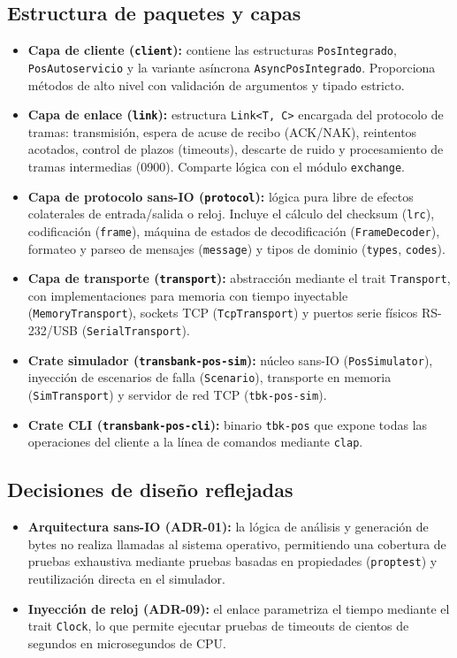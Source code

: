 \documentclass{../../plantilla/raysac-informe}
\begin{document}
\subsection{Estructura de paquetes y capas}
\begin{itemize}
  \item \textbf{Capa de cliente (\texttt{client}):} contiene las estructuras \texttt{PosIntegrado},
    \texttt{PosAutoservicio} y la variante asíncrona \texttt{AsyncPosIntegrado}. Proporciona métodos
    de alto nivel con validación de argumentos y tipado estricto.
  \item \textbf{Capa de enlace (\texttt{link}):} estructura \texttt{Link<T, C>} encargada del protocolo
    de tramas: transmisión, espera de acuse de recibo (ACK/NAK), reintentos acotados, control de plazos
    (timeouts), descarte de ruido y procesamiento de tramas intermedias (0900). Comparte lógica con
    el módulo \texttt{exchange}.
  \item \textbf{Capa de protocolo sans-IO (\texttt{protocol}):} lógica pura libre de efectos colaterales de
    entrada/salida o reloj. Incluye el cálculo del checksum (\texttt{lrc}), codificación (\texttt{frame}),
    máquina de estados de decodificación (\texttt{FrameDecoder}), formateo y parseo de mensajes
    (\texttt{message}) y tipos de dominio (\texttt{types}, \texttt{codes}).
  \item \textbf{Capa de transporte (\texttt{transport}):} abstracción mediante el trait \texttt{Transport},
    con implementaciones para memoria con tiempo inyectable (\texttt{MemoryTransport}), sockets TCP
    (\texttt{TcpTransport}) y puertos serie físicos RS-232/USB (\texttt{SerialTransport}).
  \item \textbf{Crate simulador (\texttt{transbank-pos-sim}):} núcleo sans-IO (\texttt{PosSimulator}),
    inyección de escenarios de falla (\texttt{Scenario}), transporte en memoria (\texttt{SimTransport})
    y servidor de red TCP (\texttt{tbk-pos-sim}).
  \item \textbf{Crate CLI (\texttt{transbank-pos-cli}):} binario \texttt{tbk-pos} que expone todas las
    operaciones del cliente a la línea de comandos mediante \texttt{clap}.
\end{itemize}

\subsection{Decisiones de diseño reflejadas}
\begin{itemize}
  \item \textbf{Arquitectura sans-IO (ADR-01):} la lógica de análisis y generación de bytes no realiza
    llamadas al sistema operativo, permitiendo una cobertura de pruebas exhaustiva mediante pruebas basadas
    en propiedades (\texttt{proptest}) y reutilización directa en el simulador.
  \item \textbf{Inyección de reloj (ADR-09):} el enlace parametriza el tiempo mediante el trait \texttt{Clock},
    lo que permite ejecutar pruebas de timeouts de cientos de segundos en microsegundos de CPU.
\end{itemize}
\end{document}
